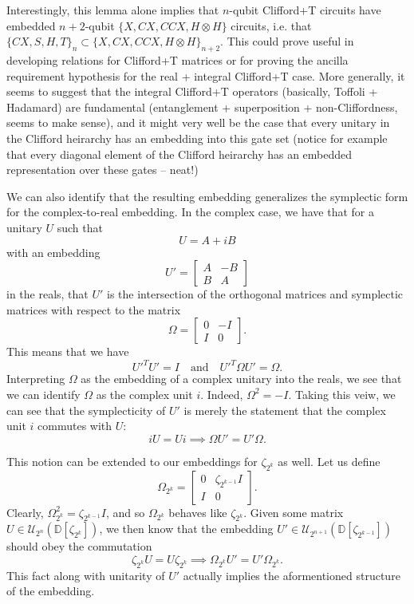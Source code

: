 \documentclass{article}
\theoremstyle{definition}
\theoremstyle{theorem}
\theoremstyle{remark}
\begin{document}
    Interestingly, this lemma alone implies that $n$-qubit Clifford+T circuits have embedded $n+2$-qubit $\{X, CX, CCX, H\otimes H\}$ circuits, i.e. that $\{CX, S, H, T\}_n \subset \{X, CX, CCX, H\otimes H\}_{n+2}$. This could prove useful in developing relations for Clifford+T matrices or for proving the ancilla requirement hypothesis for the real + integral Clifford+T case. More generally, it seems to suggest that the integral Clifford+T operators (basically, Toffoli + Hadamard) are fundamental (entanglement + superposition + non-Cliffordness, seems to make sense), and it might very well be the case that every unitary in the Clifford heirarchy has an embedding into this gate set (notice for example that every diagonal element of the Clifford heirarchy has an embedded representation over these gates -- neat!)
    
    We can also identify that the resulting embedding generalizes the symplectic form for the complex-to-real embedding. In the complex case, we have that for a unitary $U$ such that
    \[
    	U = A + iB
    \]
    with an embedding
    \[
    	U' = \begin{bmatrix}
    	A & -B \\
    	B & A
    	\end{bmatrix}
    \]
    in the reals, that $U'$ is the intersection of the orthogonal matrices and symplectic matrices with respect to the matrix
    \[
    	\Omega = \begin{bmatrix}
    	0 & -I \\
    	I & 0
    	\end{bmatrix}.
    \]
    This means that we have
    \[
    	U'^T U' = I \quad\mbox{and}\quad U'^T \Omega U' = \Omega.
    \]
    Interpreting $\Omega$ as the embedding of a complex unitary into the reals, we see that we can identify $\Omega$ as the complex unit $i$. Indeed, $\Omega^2 = -I$. Taking this veiw, we can see that the symplecticity of $U'$ is merely the statement that the complex unit $i$ commutes with $U$:
    \[
      i U = U i \implies \Omega U' = U' \Omega.
    \]
    
   	This notion can be extended to our embeddings for $\zeta_{2^{k}}$ as well. Let us define
   	\[
   		\Omega_{2^k} = \begin{bmatrix}
   		0 & \zeta_{2^{k-1}} I \\ I & 0
   		\end{bmatrix}.
   	\]
   	Clearly, $\Omega_{2^k}^2 = \zeta_{2^{k-1}} I$, and so $\Omega_{2^k}$ behaves like $\zeta_{2^{k}}$. Given some matrix $U\in\mathcal{U}_{2^n}(\mathbb{D}[\zeta_{2^{k}}])$, we then know that the embedding $U'\in\mathcal{U}_{2^{n+1}}(\mathbb{D}[\zeta_{2^{k-1}}])$ should obey the commutation
   	\[
   		\zeta_{2^{k}} U = U \zeta_{2^{k}} \implies \Omega_{2^k} U' = U' \Omega_{2^k}.
   	\]
   	This fact along with unitarity of $U'$ actually implies the aformentioned structure of the embedding.
\end{document}
